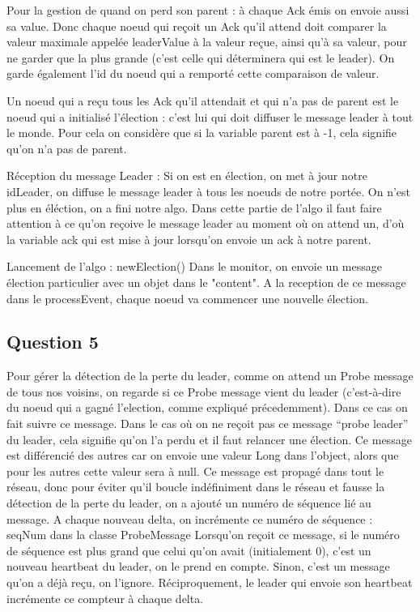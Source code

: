 \documentclass[paper=a4, fontsize=11pt]{article} %
\begin{document}
Pour la gestion de quand on perd son parent : à chaque Ack émis on envoie aussi sa value. Donc chaque noeud qui reçoit un Ack qu'il attend doit comparer la valeur maximale appelée leaderValue à la valeur reçue, ainsi qu'à sa valeur, pour ne garder que la plus grande (c'est celle qui déterminera qui est le leader). On garde également l'id du noeud qui a remporté cette comparaison de valeur.

Un noeud qui a reçu tous les Ack qu'il attendait et qui n'a pas de parent est le noeud qui a initialisé l'élection : c'est lui qui doit diffuser le message leader à tout le monde. Pour cela on considère que si la variable parent est à -1, cela signifie qu'on n'a pas de parent.

Réception du message Leader :
Si on est en élection, on met à jour notre idLeader, on diffuse le message leader à tous les noeuds de notre portée. On n'est plus en éléction, on a fini notre algo.
Dans cette partie de l'algo il faut faire attention à ce qu'on reçoive le message leader au moment où on attend un, d'où la variable ack qui est mise à jour lorsqu'on envoie un ack à notre parent.


Lancement de l'algo : newElection()
Dans le monitor, on envoie un message élection particulier avec un objet dans le "content". A la reception de ce message dans le processEvent, chaque noeud va commencer une nouvelle élection.

\subsection{Question 5}
Pour gérer la détection de la perte du leader, comme on attend un Probe message de tous nos voisins, on regarde si ce Probe message vient du leader (c'est-à-dire du noeud qui a gagné l'election, comme expliqué précedemment).
Dans ce cas on fait suivre ce message.
Dans le cas où on ne reçoit pas ce message \enquote{probe leader} du leader, cela signifie qu'on l'a perdu et il faut relancer une élection.
Ce message est différencié des autres car on envoie une valeur Long dans l'object, alors que pour les autres cette valeur sera à null.
Ce message est propagé dans tout le réseau, donc pour éviter qu'il boucle indéfiniment dans le réseau et fausse la détection de la perte du leader, on a ajouté un numéro de séquence lié au message.
A chaque nouveau delta, on incrémente ce numéro de séquence : seqNum dans la classe ProbeMessage
Lorsqu'on reçoit ce message, si le numéro de séquence est plus grand que celui qu'on avait (initialement 0), c'est un nouveau heartbeat du leader, on le prend en compte.
Sinon, c'est un message qu'on a déjà reçu, on l'ignore. Réciproquement, le leader qui envoie son heartbeat incrémente ce compteur à chaque delta.
\end{document}
